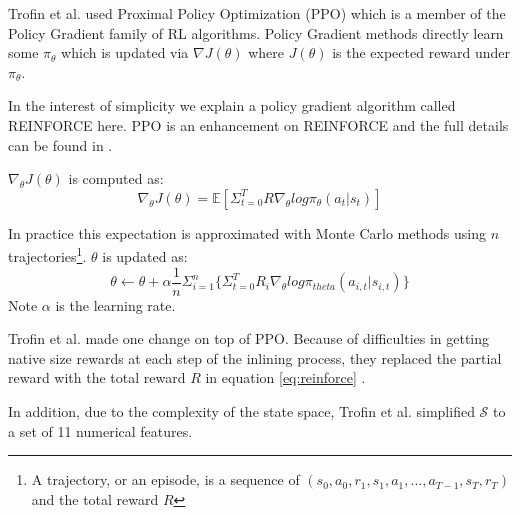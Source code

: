 \documentclass[nohyperref]{article}
\theoremstyle{plain}
\theoremstyle{definition}
\theoremstyle{remark}
\begin{document}
Trofin et al. used Proximal Policy Optimization (PPO) \cite{ppo} which is a member of the Policy Gradient \cite{pg_algo} family of RL algorithms. Policy Gradient methods directly learn some $\pi_{\theta}$ which is updated via $\nabla J(\theta)$ where $J(\theta)$ is the expected reward under $\pi_{\theta}$.

In the interest of simplicity we explain a policy gradient algorithm called REINFORCE \cite{REINFORCE} here. PPO is an enhancement on REINFORCE and the full details can be found in \cite{ppo}.

$\nabla_{\theta}J(\theta)$ is computed as:
\begin{equation} \label{eq:reinforce}
    \nabla_{\theta}J(\theta) = \mathbb{E}\left[\Sigma^{T}_{t=0}R\nabla_{\theta}log\pi_{\theta}(a_t|s_t)\right]
\end{equation}

In practice this expectation is approximated with Monte Carlo methods using $n$ trajectories\footnote{A trajectory, or an episode, is a sequence of $(s_0, a_0, r_1, s_1, a_1, ..., a_{T-1}, s_T, r_T)$ and the total reward $R$}. $\theta$ is updated as:
\begin{equation}\label{eq:updatetheta}
    \theta \leftarrow \theta + \alpha\frac{1}{n}\Sigma^{n}_{i=1}\bigl\{\Sigma^{T}_{t=0}R_{i}\nabla_{\theta}log\pi_{theta}(a_{i,t}|s_{i,t})\bigr\}
\end{equation}
Note $\alpha$ is the learning rate.

Trofin et al. made one change on top of PPO. Because of difficulties in getting native size rewards at each step of the inlining process, they replaced the partial reward with the total reward $R$ in equation \ref{eq:reinforce} \cite{mlgo}.

In addition, due to the complexity of the state space, Trofin et al. simplified $\mathcal{S}$ to a set of 11 numerical features.



\end{document}

